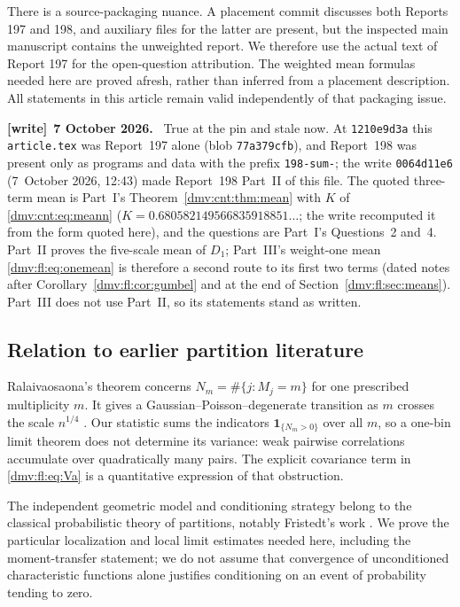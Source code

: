\documentclass[11pt,letterpaper]{article}
\numberwithin{equation}{section}
\theoremstyle{definition}\newtheorem{definition}[theorem]{Definition}
\theoremstyle{remark}\newtheorem{remark}[theorem]{Remark}
\newcommand{\file}[1]{\nolinkurl{#1}}
\newenvironment{writenote}[1][]{\par\smallskip\begingroup\small
 \noindent\textbf{[write]}\if\relax\detokenize{#1}\relax\else~\textbf{#1.}\fi\ }%
 {\par\endgroup\smallskip}
\newcommand{\ind}{\mathbf 1}
\begin{document}
There is a source-packaging nuance. A placement commit discusses both
Reports 197 and 198, and auxiliary files for the latter are present, but
the inspected main manuscript contains the unweighted report. We therefore
use the actual text of Report 197 for the open-question attribution.
The weighted mean formulas needed here are proved afresh, rather than
inferred from a placement description. All statements in this article
remain valid independently of that packaging issue.
\begin{writenote}[7 October 2026]
True at the pin and stale now. At \file{1210e9d3a} this
\file{article.tex} was Report~197 alone (blob \file{77a379cfb}), and
Report~198 was present only as programs and data with the prefix
\file{198-sum-}; the write \file{0064d11e6} (7~October 2026, 12:43) made
Report~198 Part~II of this file. The quoted three-term mean is Part~I's
Theorem~\ref{dmv:cnt:thm:mean} with $K$ of \eqref{dmv:cnt:eq:meann}
($K=0.680582149566835918851\ldots$; the write recomputed it from the form
quoted here), and the questions are Part~I's Questions~2 and~4. Part~II
proves the five-scale mean of $D_1$; Part~III's weight-one mean
\eqref{dmv:fl:eq:onemean} is therefore a second route to its first two
terms (dated notes after Corollary~\ref{dmv:fl:cor:gumbel} and at the end
of Section~\ref{dmv:fl:sec:means}). Part~III does not use Part~II, so its
statements stand as written.
\end{writenote}

\subsection{Relation to earlier partition literature}
Ralaivaosaona's theorem concerns
$N_m=\#\{j:M_j=m\}$ for one prescribed multiplicity $m$. It gives a
Gaussian--Poisson--degenerate transition as $m$ crosses the scale
$n^{1/4}$ \cite{ralaivaosaona}. Our statistic sums the indicators
$\ind_{\{N_m>0\}}$ over all $m$, so a one-bin limit theorem does not
determine its variance: weak pairwise correlations accumulate over
quadratically many pairs. The explicit covariance term in
\eqref{dmv:fl:eq:Va} is a quantitative expression of that obstruction.

The independent geometric model and conditioning strategy belong to the
classical probabilistic theory of partitions, notably Fristedt's work
\cite{fristedt}. We prove the particular localization and local limit
estimates needed here, including the moment-transfer statement; we do not
assume that convergence of unconditioned characteristic functions alone
justifies conditioning on an event of probability tending to zero.
\end{document}
